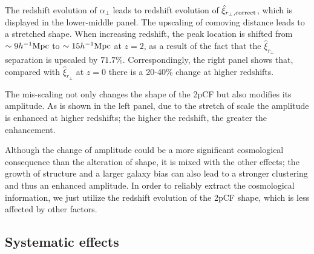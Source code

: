 \documentclass[iop]{emulateapj}
\begin{document}
The redshift evolution of $\alpha_{\perp}$ leads to redshift evolution of 
$\hat \xi_{r_\perp, \rm correct}$,
which is displayed in the lower-middle panel.
The upscaling of comoving distance leads to a stretched shape.
When increasing redshift,
the peak location is shifted from $\sim9h^{-1} \rm Mpc$ to $\sim15 h^{-1}\rm Mpc$ at $z=2$,
as a result of the fact that the $\hat\xi_{r_{\perp}}$ separation is upscaled by $71.7\%$.
Correspondingly, the right panel shows that, 
compared with $\hat \xi_{r_\perp}$ at $z=0$ there is a 20-40\% change at higher redshifts.

The mis-scaling not only changes the shape of the 2pCF but also modifies its amplitude. %
As is shown in the left panel, due to the stretch of scale the amplitude is enhanced at higher redshifts;
the higher the redshift, the greater the enhancement.%

Although the change of amplitude could be a more significant cosmological consequence 
than the alteration of shape,
it is mixed with the other effects; 
the growth of structure and a larger galaxy bias can also lead to a stronger clustering and thus an enhanced amplitude.
In order to reliably extract the cosmological information, 
we just utilize the redshift evolution of the 2pCF shape, 
which is less affected by other factors.


\subsection{Systematic effects}
\end{document}
